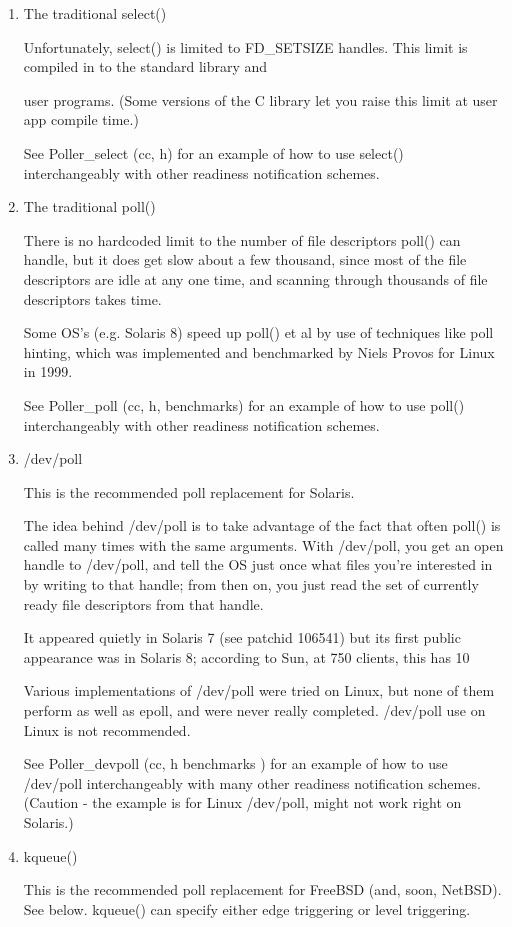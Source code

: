 \documentclass[12pt, twoside, a4paper, xetex]{report}
\begin{document}
	\begin{enumerate}
	\item The traditional select() 
	
	Unfortunately, select() is limited to FD\_SETSIZE handles. This limit is compiled in to the standard library and 
	
	user programs. (Some versions of the C library let you raise this limit at user app compile time.)
	
	See Poller\_select (cc, h) for an example of how to use select() interchangeably with other readiness 
	notification schemes.

	\item  The traditional poll()
	 
	There is no hardcoded limit to the number of file descriptors poll() can handle, but it does get slow about a 
	few thousand, since most of the file descriptors are idle at any one time, and scanning through thousands of 
	file descriptors takes time.
	
	Some OS's (e.g. Solaris 8) speed up poll() et al by use of techniques like poll hinting, which was implemented 
	and benchmarked by Niels Provos for Linux in 1999.

	See Poller\_poll (cc, h, benchmarks) for an example of how to use poll() interchangeably with other readiness 
	notification schemes.

	\item /dev/poll
	
	This is the recommended poll replacement for Solaris.
	
	The idea behind /dev/poll is to take advantage of the fact that often poll() is called many times with the same 
	arguments. With /dev/poll, you get an open handle to /dev/poll, and tell the OS just once what files you're 
	interested in by writing to that handle; from then on, you just read the set of currently ready file
	descriptors from that handle.

	It appeared quietly in Solaris 7 (see patchid 106541) but its first public appearance was in Solaris 8; 	
	according to Sun, at 750 clients, this has 10%

	Various implementations of /dev/poll were tried on Linux, but none of them perform as well as epoll, and were 
	never really completed. /dev/poll use on Linux is not recommended.

	See Poller\_devpoll (cc, h benchmarks ) for an example of how to use /dev/poll interchangeably with many other 
	readiness notification schemes. (Caution - the example is for Linux /dev/poll, might not work right on Solaris.)

	\item kqueue()
	
	This is the recommended poll replacement for FreeBSD (and, soon, NetBSD).
	See below. kqueue() can specify either edge triggering or level triggering.
	
	\end{enumerate}
\end{document}
